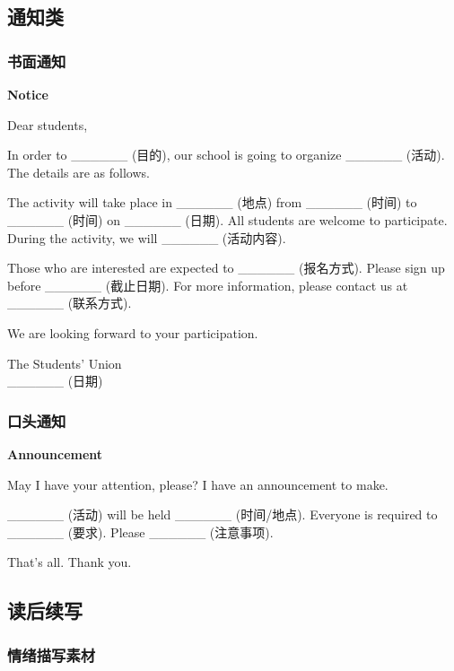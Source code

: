 \subsection{通知类}

\subsubsection{书面通知}

\begin{center}
\textbf{Notice}
\end{center}

Dear students,

In order to \_\_\_\_\_\_ (目的), our school is going to organize \_\_\_\_\_\_ (活动). The details are as follows.

The activity will take place in \_\_\_\_\_\_ (地点) from \_\_\_\_\_\_ (时间) to \_\_\_\_\_\_ (时间) on \_\_\_\_\_\_ (日期). All students are welcome to participate. During the activity, we will \_\_\_\_\_\_ (活动内容).

Those who are interested are expected to \_\_\_\_\_\_ (报名方式). Please sign up before \_\_\_\_\_\_ (截止日期). For more information, please contact us at \_\_\_\_\_\_ (联系方式).

We are looking forward to your participation.

\begin{center}
The Students' Union\\
\_\_\_\_\_\_ (日期)
\end{center}

\subsubsection{口头通知}

\begin{center}
\textbf{Announcement}
\end{center}

May I have your attention, please? I have an announcement to make.

\_\_\_\_\_\_ (活动) will be held \_\_\_\_\_\_ (时间/地点). Everyone is required to \_\_\_\_\_\_ (要求). Please \_\_\_\_\_\_ (注意事项).

That's all. Thank you.

\subsection{读后续写}

\subsubsection{情绪描写素材}

